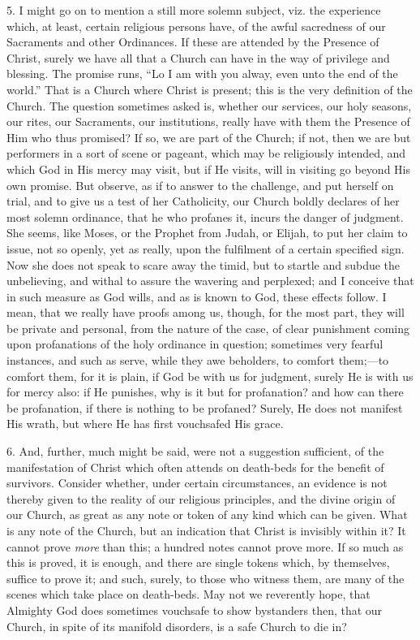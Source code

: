 5. I might go on to mention a still more solemn subject, viz. the
experience which, at least, certain religious persons have, of the
awful sacredness of our Sacraments and other Ordinances. If these are
attended by the Presence of Christ, surely we have all that a Church
can have in the way of privilege and blessing. The promise runs,
``Lo I am with you alway, even unto the end of the world.''
That is a Church where Christ is present; this is the very definition
of the Church. The question sometimes asked is, whether our services,
our holy seasons, our rites, our Sacraments, our institutions, really
have with them the Presence of Him who thus promised? If so, we are
part of the Church; if not, then we are but performers in a sort of
scene or pageant, which may be religiously intended, and which God in
His mercy may visit, but if He visits, will in visiting go beyond His
own promise. But observe, as if to answer to the challenge, and put
herself on trial, and to give us a test of her Catholicity, our Church
boldly declares of her most solemn ordinance, that he who profanes it,
incurs the danger of judgment. She seems, like Moses, or the Prophet
from Judah, or Elijah, to put her claim to issue, not so openly, yet
as really, upon the fulfilment of a certain specified sign. Now she
does not speak to scare away the timid, but to startle and subdue the
unbelieving, and withal to assure the wavering and perplexed; and I
conceive that in such measure as God wills, and as is known to God,
these effects follow. I mean, that we really have proofs among us,
though, for the most part, they will be private and personal, from the
nature of the case, of clear punishment coming upon profanations of
the holy ordinance in question; sometimes very fearful instances, and
such as serve, while they awe beholders, to comfort them;—to comfort
them, for it is plain, if God be with us for judgment, surely He is
with us for mercy also: if He punishes, why is it but for profanation?
and how can there be profanation, if there is nothing to be profaned?
Surely, He does not manifest His wrath, but where He has first
vouchsafed His grace.

6. And, further, much might be said, were not a suggestion
sufficient, of the manifestation of Christ which often attends on
death-beds for the benefit of survivors. Consider whether, under
certain circumstances, an evidence is not thereby given to the reality
of our religious principles, and the divine origin of our Church, as
great as any note or token of any kind which can be given. What is any
note of the Church, but an indication that Christ is invisibly within
it? It cannot prove \emph{more} than this; a hundred notes cannot
prove more. If so much as this is proved, it is enough, and there are
single tokens which, by themselves, suffice to prove it; and such,
surely, to those who witness them, are many of the scenes which take
place on death-beds. May not we reverently hope, that Almighty God
does sometimes vouchsafe to show bystanders then, that our Church, in
spite of its manifold disorders, is a safe Church to die in?

